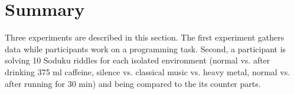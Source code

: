 \section{Summary}
Three experiments are described in this section. The first experiment gathers data while participants work on a programming task. 
Second, a participant is solving 10 Soduku riddles for each isolated environment (normal vs. after drinking 375 ml caffeine, silence vs. classical music vs. heavy metal, normal vs. after running for 30 min) and being compared to the its counter parts. 
